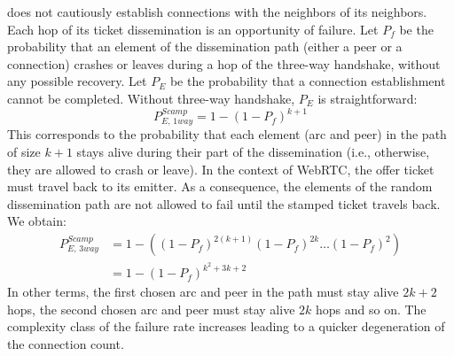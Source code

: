 \begin{asparadesc}
  \SCAMP does not cautiously establish connections with the neighbors of its
  neighbors.  Each hop of its ticket dissemination is an opportunity of failure.
  Let $P_f$ be the probability that an element of the dissemination path (either
  a peer or a connection) crashes or leaves during a hop of the three-way
  handshake, without any possible recovery. Let $P_E$ be the probability that a
  connection establishment cannot be completed. Without three-way handshake,
  $P_E$ is straightforward:
  \begin{equation} P_{E,\,1way}^{Scamp}=1-(1- P_f)^{k+1} \end{equation} This
  corresponds to the probability that each element (arc and peer) in the path of
  size $k+1$ stays alive during their part of the dissemination (i.e.,
  otherwise, they are allowed to crash or leave). In the context of WebRTC, the
  offer ticket must travel back to its emitter. As a consequence, the elements
  of the random dissemination path are not allowed to fail until the stamped
  ticket travels back. We obtain:
  \begin{align} P_{E,\,3way}^{Scamp} &=1 - ((1-P_f)^{2(k+1)} (1-P_f)^{2k}
                                       \ldots (1-P_f)^2) \nonumber \\
                                     &=1-(1-P_f)^{k^2+3k+2}
  \end{align}
  In other terms, the first chosen arc and peer in the path must stay alive
  $2k+2$ hops, the second chosen arc and peer must stay alive $2k$ hops and so
  on.  The complexity class of the \SCAMP failure rate increases leading to a
  quicker degeneration of the connection count. 


\end{asparadesc}

